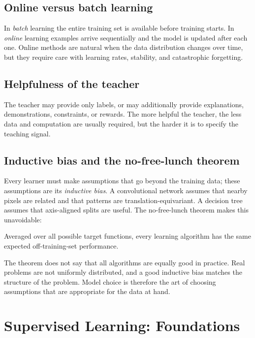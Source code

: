 \documentclass[a4paper, 12pt]{book}
\begin{document}
\section{Online versus batch learning}

In \emph{batch} learning the entire training set is available before training starts.
In \emph{online} learning examples arrive sequentially and the model is updated after
each one. Online methods are natural when the data distribution changes over time,
but they require care with learning rates, stability, and catastrophic forgetting.

\section{Helpfulness of the teacher}

The teacher may provide only labels, or may additionally provide explanations,
demonstrations, constraints, or rewards. The more helpful the teacher, the less data
and computation are usually required, but the harder it is to specify the teaching
signal.

\section{Inductive bias and the no-free-lunch theorem}

Every learner must make assumptions that go beyond the training data; these
assumptions are its \emph{inductive bias}. A convolutional network assumes that
nearby pixels are related and that patterns are translation-equivariant. A decision
tree assumes that axis-aligned splits are useful. The no-free-lunch theorem makes
this unavoidable:

\begin{theorem}
Averaged over all possible target functions, every learning algorithm has the same
expected off-training-set performance.
\end{theorem}

The theorem does not say that all algorithms are equally good in practice. Real
problems are not uniformly distributed, and a good inductive bias matches the
structure of the problem. Model choice is therefore the art of choosing assumptions
that are appropriate for the data at hand.

\chapter{Supervised Learning: Foundations}
\label{ch:supervised}
\end{document}
